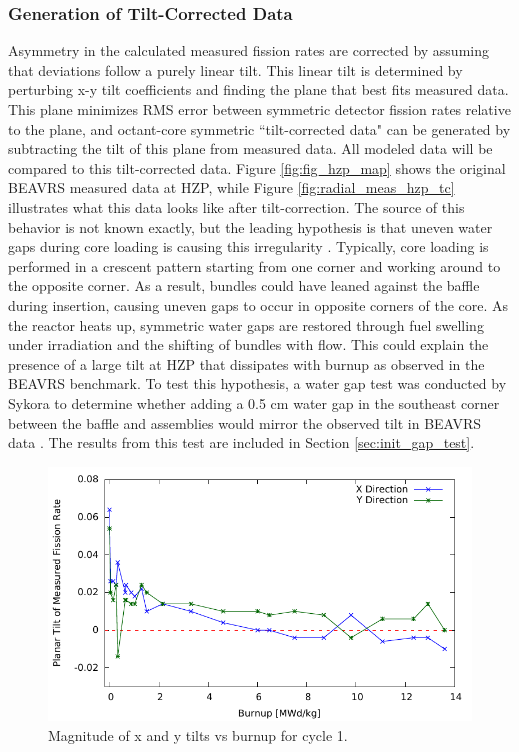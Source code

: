 \documentclass{article}
\begin{document}


\subsubsection{Generation of Tilt-Corrected Data}\label{sec:gen_tc_data}

Asymmetry in the calculated measured fission rates are corrected by assuming that deviations follow a purely linear tilt. This linear tilt is determined by perturbing x-y tilt coefficients and finding the plane that best fits measured data. This plane minimizes RMS error between symmetric detector fission rates relative to the plane, and octant-core symmetric ``tilt-corrected data" can be generated by subtracting the tilt of this plane from measured data. All modeled data will be compared to this tilt-corrected data. Figure \ref{fig:fig_hzp_map} shows the original BEAVRS measured data at HZP, while Figure \ref{fig:radial_meas_hzp_tc} illustrates what this data looks like after tilt-correction. The source of this behavior is not known exactly, but the leading hypothesis is that uneven water gaps during core loading is causing this irregularity \cite{liang_year1_report}. Typically, core loading is performed in a crescent pattern starting from one corner and working around to the opposite corner. As a result, bundles could have leaned against the baffle during insertion, causing uneven gaps to occur in opposite corners of the core. As the reactor heats up, symmetric water gaps are restored through fuel swelling under irradiation and the shifting of bundles with flow. This could explain the presence of a large tilt at HZP that dissipates with burnup as observed in the BEAVRS benchmark. To test this hypothesis, a water gap test was conducted by Sykora to determine whether adding a 0.5 cm water gap in the southeast corner between the baffle and assemblies would mirror the observed tilt in BEAVRS data \cite{sykora_ms}. The results from this test are included in Section \ref{sec:init_gap_test}.

\begin{figure}[!htb]
\centering
\includegraphics[width = 4.5 in]{figures/tilts_cyc1.pdf}
\caption{Magnitude of x and y tilts vs burnup for cycle 1.}
\label{fig:tilts_cyc1}
\end{figure}
\end{document}
